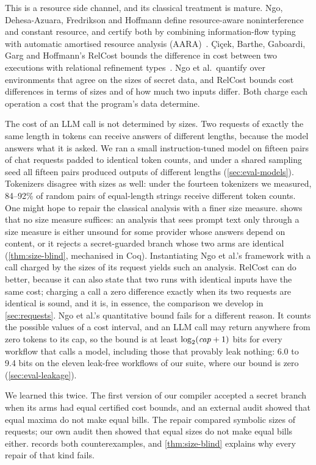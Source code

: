 This is a resource side channel, and its classical treatment is mature. Ngo,
Dehesa-Azuara, Fredrikson and Hoffmann define resource-aware noninterference and
constant resource, and certify both by combining information-flow typing with
automatic amortised resource analysis (AARA)~\cite{ngo2017verifying}. Çiçek,
Barthe, Gaboardi, Garg and Hoffmann's RelCost bounds the difference in cost
between two executions with relational refinement types~\cite{cicek2017relational}.
Ngo et al.\ quantify over environments that agree on the sizes of secret data, and
RelCost bounds cost differences in terms of sizes and of how much two inputs
differ. Both charge each operation a cost that the program's data determine.

The cost of an LLM call is not determined by sizes. Two requests of exactly the
same length in tokens can receive answers of different lengths, because the model
answers what it is asked. We ran a small instruction-tuned model on fifteen pairs
of chat requests padded to identical token counts, and under a shared sampling
seed all fifteen pairs produced outputs of different lengths
(\cref{sec:eval-models}). Tokenizers disagree with sizes as well: under the
fourteen tokenizers we measured, 84--92\% of random pairs of equal-length strings
receive different token counts. One might hope to repair the classical analysis
with a finer size measure.  shows that no size measure suffices:
an analysis that sees prompt text only through a size measure is either unsound
for some provider whose answers depend on content, or it rejects a secret-guarded
branch whose two arms are identical (\cref{thm:size-blind}, mechanised in Coq).
Instantiating Ngo et al.'s framework with a call charged by the sizes of its
request yields such an analysis. RelCost can do better, because it can also state
that two runs with identical inputs have the same cost; charging a call a zero
difference exactly when its two requests are identical is sound, and it is, in
essence, the comparison we develop in \cref{sec:requests}. Ngo et al.'s
quantitative bound fails for a different reason. It counts the possible values of
a cost interval, and an LLM call may return anywhere from zero tokens to its cap,
so the bound is at least $\log_2(\mathit{cap}+1)$ bits for every workflow that calls a
model, including those that provably leak nothing: 6.0 to 9.4 bits on the eleven
leak-free workflows of our suite, where our bound is zero (\cref{sec:eval-leakage}).

We learned this twice. The first version of our compiler accepted a secret branch
when its arms had equal certified cost bounds, and an external audit showed that
equal maxima do not make equal bills. The repair compared symbolic sizes of
requests; our own audit then showed that equal sizes do not make equal bills
either.  records both counterexamples, and \cref{thm:size-blind}
explains why every repair of that kind fails.

